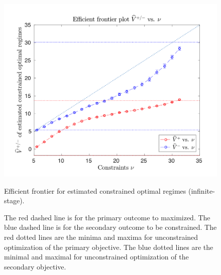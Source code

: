 \begin{figure}[!htbp]
	\centering
	\includegraphics[width=.9\linewidth]{./Chapter-3/figs/efficient_plot.png}
	\caption{Efficient frontier for estimated constrained optimal regimes (infinite-stage).}
	\caption*{The red dashed line is for the primary outcome to maximized. The blue dashed line is for the secondary outcome to be constrained. The red dotted lines are the minima and maxima for unconstrained optimization of the primary objective. The blue dotted lines are the minimal and maximal for unconstrained optimization of the secondary objective.}
	\label{fig:1}
\end{figure}

